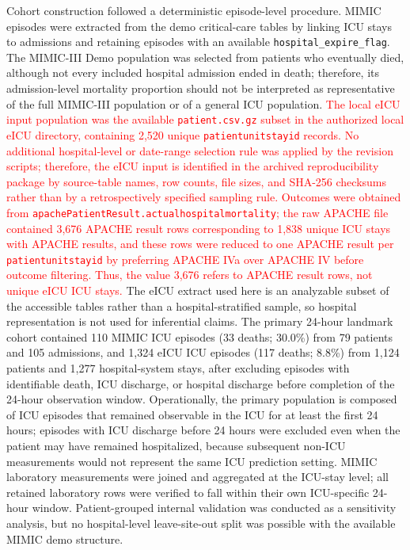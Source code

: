\documentclass[utf8]{FrontiersinHarvard} %
\begin{document}
Cohort construction followed a deterministic episode-level procedure. MIMIC episodes were extracted from the demo critical-care tables by linking ICU stays to admissions and retaining episodes with an available \texttt{hospital\_expire\_flag}. The MIMIC-III Demo population was selected from patients who eventually died, although not every included hospital admission ended in death; therefore, its admission-level mortality proportion should not be interpreted as representative of the full MIMIC-III population or of a general ICU population. \textcolor{red}{The local eICU input population was the available \texttt{patient.csv.gz} subset in the authorized local eICU directory, containing 2,520 unique \texttt{patientunitstayid} records. No additional hospital-level or date-range selection rule was applied by the revision scripts; therefore, the eICU input is identified in the archived reproducibility package by source-table names, row counts, file sizes, and SHA-256 checksums rather than by a retrospectively specified sampling rule. Outcomes were obtained from \texttt{apachePatientResult.actualhospitalmortality}; the raw APACHE file contained 3,676 APACHE result rows corresponding to 1,838 unique ICU stays with APACHE results, and these rows were reduced to one APACHE result per \texttt{patientunitstayid} by preferring APACHE IVa over APACHE IV before outcome filtering. Thus, the value 3,676 refers to APACHE result rows, not unique eICU ICU stays.} The eICU extract used here is an analyzable subset of the accessible tables rather than a hospital-stratified sample, so hospital representation is not used for inferential claims. The primary 24-hour landmark cohort contained 110 MIMIC ICU episodes (33 deaths; 30.0\%) from 79 patients and 105 admissions, and 1,324 eICU ICU episodes (117 deaths; 8.8\%) from 1,124 patients and 1,277 hospital-system stays, after excluding episodes with identifiable death, ICU discharge, or hospital discharge before completion of the 24-hour observation window. Operationally, the primary population is composed of ICU episodes that remained observable in the ICU for at least the first 24 hours; episodes with ICU discharge before 24 hours were excluded even when the patient may have remained hospitalized, because subsequent non-ICU measurements would not represent the same ICU prediction setting. MIMIC laboratory measurements were joined and aggregated at the ICU-stay level; all retained laboratory rows were verified to fall within their own ICU-specific 24-hour window. Patient-grouped internal validation was conducted as a sensitivity analysis, but no hospital-level leave-site-out split was possible with the available MIMIC demo structure.
\end{document}
